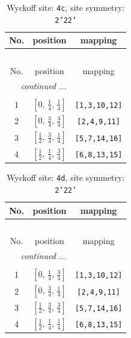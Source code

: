 \documentclass[fleqn,8pt]{jsarticle}
\begin{document}
\renewcommand{\arraystretch}{1.2}
\begin{longtable}{ccc}
\caption{Wyckoff site: {\tt 4c}, site symmetry: {\tt 2'22'}}
 \\
 \hline \hline
No. & position & mapping \\ \hline \endfirsthead

\multicolumn{2}{l}{\tablename\ \thetable{}} \\
 \hline \hline
No. & position & mapping \\ \hline \endhead

 \hline \hline
\multicolumn{2}{r}{\footnotesize\it continued ...} \\ \endfoot

 \hline \hline
\multicolumn{2}{r}{} \\ \endlastfoot

1 & $\left[ 0,\, \frac{1}{4},\, \frac{1}{4} \right]$ & {\tt [1,3,10,12]} \\ \hline
2 & $\left[ 0,\, \frac{3}{4},\, \frac{3}{4} \right]$ & {\tt [2,4,9,11]} \\ \hline
3 & $\left[ \frac{1}{2},\, \frac{3}{4},\, \frac{1}{4} \right]$ & {\tt [5,7,14,16]} \\ \hline
4 & $\left[ \frac{1}{2},\, \frac{1}{4},\, \frac{3}{4} \right]$ & {\tt [6,8,13,15]} \\
\end{longtable}
\renewcommand{\arraystretch}{1.2}
\begin{longtable}{ccc}
\caption{Wyckoff site: {\tt 4d}, site symmetry: {\tt 2'22'}}
 \\
 \hline \hline
No. & position & mapping \\ \hline \endfirsthead

\multicolumn{2}{l}{\tablename\ \thetable{}} \\
 \hline \hline
No. & position & mapping \\ \hline \endhead

 \hline \hline
\multicolumn{2}{r}{\footnotesize\it continued ...} \\ \endfoot

 \hline \hline
\multicolumn{2}{r}{} \\ \endlastfoot

1 & $\left[ 0,\, \frac{1}{4},\, \frac{3}{4} \right]$ & {\tt [1,3,10,12]} \\ \hline
2 & $\left[ 0,\, \frac{3}{4},\, \frac{1}{4} \right]$ & {\tt [2,4,9,11]} \\ \hline
3 & $\left[ \frac{1}{2},\, \frac{3}{4},\, \frac{3}{4} \right]$ & {\tt [5,7,14,16]} \\ \hline
4 & $\left[ \frac{1}{2},\, \frac{1}{4},\, \frac{1}{4} \right]$ & {\tt [6,8,13,15]} \\
\end{longtable}
\end{document}
